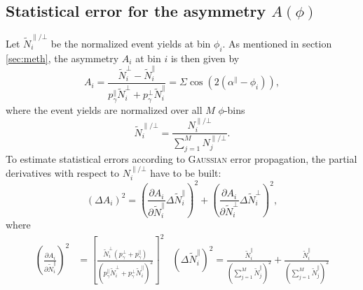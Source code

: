 \chapter{}
\label{sec:app}
\section{Statistical error for the asymmetry $A(\phi)$}
\label{sec:stat_err}
Let $\tilde{N}^{\parallel/\bot}_i$ be the normalized event yields at bin $\phi_i$. As mentioned in section \ref{sec:meth}, the asymmetry $A_i$ at bin $i$ is then given by
\begin{equation}
	A_i=\frac{\tilde{N}^\bot_i-\tilde{N}^\parallel_i}{p_\gamma^\parallel\tilde{N}^\bot_i+p_\gamma^\bot\tilde{N}^\parallel_i}=\Sigma\cos\left(2\left(\alpha^\parallel-\phi_i\right)\right),
	\label{eq:evyieldasym_app}
\end{equation}
where the event yields are normalized over all $M$ $\phi$-bins $$\tilde{N}^{\parallel/\bot}_i=\frac{N_i^{\parallel/\bot}}{\sum_{j=1}^{M}N_j^{\parallel/\bot}}.$$
 To estimate statistical errors according to \textsc{Gaussian} error propagation, the partial derivatives with respect to $N_i^{\parallel/\bot}$ have to be built:
 \begin{equation}
 	\left(\Delta A_i\right)^2=\left(\frac{\partial A_i}{\partial \tilde{N}^\parallel_i}\Delta \tilde{N}^\parallel_i\right)^2+\left(\frac{\partial A_i}{\partial \tilde{N}^\bot_i}\Delta \tilde{N}^\bot_i\right)^2,
 \end{equation}
where
\begin{align}
	\left(\frac{\partial A_i}{\partial \tilde{N}^\parallel_i}\right)^2&=\left[\frac{\tilde{N}^\bot_i\left(p_\gamma^\bot+p_\gamma^\parallel\right)}{\left(p_\gamma^\parallel\tilde{N}^\bot_i+p_\gamma^\bot\tilde{N}^\parallel_i\right)^2}\right]^2 &\left(\Delta\tilde{N}_i^\parallel\right)^2=\frac{\tilde{N}_i^\parallel}{\left(\sum_{j=1}^M \tilde{N}^\parallel_j\right)^2}+\frac{\tilde{N}_i^{\parallel}}{\left(\sum_{j=1}^M \tilde{N}^\parallel_j\right)^2}
\end{align}